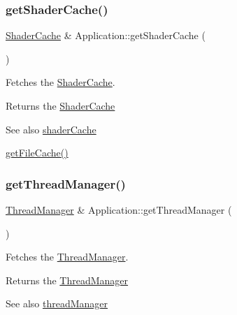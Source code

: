 \subsubsection{\texorpdfstring{getShaderCache()}{getShaderCache()}}
{\footnotesize\ttfamily \mbox{\hyperlink{classsage_1_1ShaderCache}{Shader\+Cache}} \& Application\+::get\+Shader\+Cache (\begin{DoxyParamCaption}{ }\end{DoxyParamCaption})}



Fetches the \mbox{\hyperlink{classsage_1_1ShaderCache}{Shader\+Cache}}. 

\begin{DoxyReturn}{Returns}
the \mbox{\hyperlink{classsage_1_1ShaderCache}{Shader\+Cache}} 
\end{DoxyReturn}
\begin{DoxySeeAlso}{See also}
\mbox{\hyperlink{classsage_1_1Application_a9a7bcc406dca9a460d54f11c2eda47c4}{shader\+Cache}} 

\mbox{\hyperlink{classsage_1_1Application_adaacf80b3ecc3efdd4696b869ca3aedd}{get\+File\+Cache()}} 
\end{DoxySeeAlso}
\mbox{\label{classsage_1_1Application_a8cf21b81ebd78065cef478cc57847eab}} 
\subsubsection{\texorpdfstring{getThreadManager()}{getThreadManager()}}
{\footnotesize\ttfamily \mbox{\hyperlink{classsage_1_1ThreadManager}{Thread\+Manager}} \& Application\+::get\+Thread\+Manager (\begin{DoxyParamCaption}{ }\end{DoxyParamCaption})}



Fetches the \mbox{\hyperlink{classsage_1_1ThreadManager}{Thread\+Manager}}. 

\begin{DoxyReturn}{Returns}
the \mbox{\hyperlink{classsage_1_1ThreadManager}{Thread\+Manager}} 
\end{DoxyReturn}
\begin{DoxySeeAlso}{See also}
\mbox{\hyperlink{classsage_1_1Application_a32a666257ae6b2729ebaf2906abc13d4}{thread\+Manager}} 
\end{DoxySeeAlso}
\mbox{\label{classsage_1_1Application_a20be3d592c9d2662051796420d0cd1d8}} 
